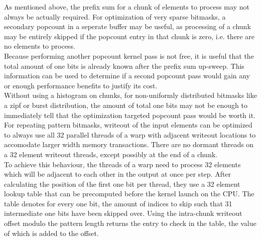 \documentclass{tudscrreprt}
\begin{document}
			As mentioned above, the prefix sum for a chunk of elements to process may not always be actually required. For optimization of very sparse bitmasks, a secondary popcount in a seperate buffer may be useful, as processing of a chunk may be entirely skipped if the popcount entry in that chunk is zero, i.e. there are no elements to process. \\
			Because performing another popcount kernel pass is not free, it is useful that the total amount of one bits is already known after the prefix sum up-sweep. This information can be used to determine if a second popcount pass would gain any or enough performance benefits to justify its cost. \\
			Without using a histogram on chunks, for non-uniformly distributed bitmasks like a zipf or burst distribution, the amount of total one bits may not be enough to immediately tell that the optimization targeted popcount pass would be worth it. \\
			
			For repeating pattern bitmasks, writeout of the input elements can be optimized to always use all 32 parallel threads of a warp with adjacent writeout locations to accomodate larger width memory transactions. There are no dormant threads on a 32 element writeout threads, except possibly at the end of a chunk. \\
			To achieve this behaviour, the threads of a warp need to process 32 elements which will be adjacent to each other in the output at once per step. After calculating the position of the first one bit per thread, they use a 32 element lookup table that can be precomputed before the kernel launch on the CPU. The table denotes for every one bit, the amount of indices to skip such that 31 intermediate one bits have been skipped over. Using the intra-chunk writeout offset modulo the pattern length returns the entry to check in the table, the value of which is added to the offset. \\
		
\end{document}

